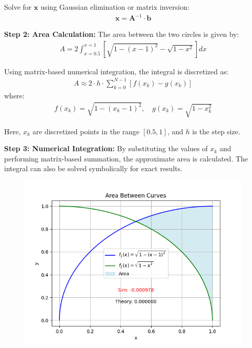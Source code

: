 \documentclass[journal]{IEEEtran}
\begin{document}
Solve for \(\bm{x}\) using Gaussian elimination or matrix inversion:
\begin{align}
    \bm{x} = \bm{A}^{-1} \cdot \bm{b}
\end{align}

\textbf{Step 2: Area Calculation:}
The area between the two circles is given by:
\begin{align}
    A = 2 \int_{x=0.5}^{x=1} \left[ \sqrt{1 - (x - 1)^2} - \sqrt{1 - x^2} \right] dx
\end{align}

Using matrix-based numerical integration, the integral is discretized as:
\begin{align}
    A \approx 2 \cdot h \cdot \sum_{k=0}^{N-1} \left[ f(x_k) - g(x_k) \right]
\end{align}
where:
\begin{align}
    f(x_k) = \sqrt{1 - (x_k - 1)^2}, \quad g(x_k) = \sqrt{1 - x_k^2}
\end{align}

Here, \(x_k\) are discretized points in the range \([0.5, 1]\), and \(h\) is the step size.

\textbf{Step 3: Numerical Integration:}
By substituting the values of \(x_k\) and performing matrix-based summation, the approximate area is calculated. The integral can also be solved symbolically for exact results.


\begin{figure}[h!]
    \centering
    \includegraphics[width=\columnwidth]{figs/fig.png} 
\end{figure}
\end{document}
